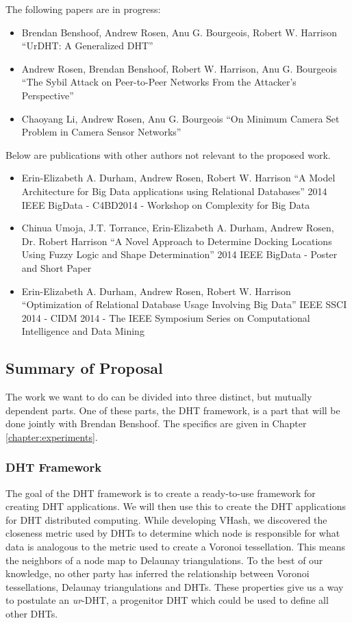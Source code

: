 The following papers are in progress:

\begin{itemize}
	\item Brendan Benshoof, Andrew Rosen, Anu G. Bourgeois, Robert W. Harrison ``UrDHT: A Generalized DHT''
	\item Andrew Rosen, Brendan Benshoof, Robert W. Harrison, Anu G. Bourgeois ``The Sybil Attack on Peer-to-Peer Networks From the Attacker's Perspective''
	\item Chaoyang Li, Andrew Rosen, Anu G. Bourgeois ``On Minimum Camera Set Problem in Camera Sensor Networks''
\end{itemize}


	

Below are publications with other authors not relevant to the proposed work.
\begin{itemize}
	\item  Erin-Elizabeth A. Durham, Andrew Rosen, Robert W. Harrison
	``A Model Architecture for Big Data applications using Relational Databases''
	2014 IEEE BigData - C4BD2014 - Workshop on Complexity for Big Data  \cite{durham2014model}
	\item Chinua Umoja, J.T. Torrance, Erin-Elizabeth A. Durham, Andrew Rosen, Dr. Robert Harrison
	``A Novel Approach to Determine Docking Locations Using Fuzzy Logic and Shape Determination''
	2014 IEEE BigData - Poster and Short Paper \cite{umoja2014novel}
	\item  Erin-Elizabeth A. Durham, Andrew Rosen, Robert W. Harrison
	``Optimization of Relational Database Usage Involving Big Data'' 
	IEEE SSCI 2014 - CIDM 2014 - The IEEE Symposium Series on Computational Intelligence and Data Mining \cite{durham2014optimization}
\end{itemize}



\subsection{Summary of Proposal}


The work we want to do can be divided into three distinct, but mutually dependent parts.
One of these parts, the DHT framework, is a part that will be done jointly with Brendan Benshoof.
The specifics are given in Chapter \ref{chapter:experiments}.


\subsubsection{DHT Framework}
The goal of the DHT framework is to create a ready-to-use framework for creating DHT applications.
We will then use this to create the DHT applications for DHT distributed computing.
While developing VHash, we discovered the closeness metric used by DHTs to determine which node is responsible for what data is analogous to the metric used to create a Voronoi tessellation.
This means the neighbors of a node map to Delaunay triangulations. 
To the best of our knowledge, no other party has inferred the relationship between Voronoi tessellations, Delaunay triangulations and DHTs.
These properties give us a way to postulate an \textit{ur}-DHT, a progenitor DHT which could be used to define all other DHTs.


